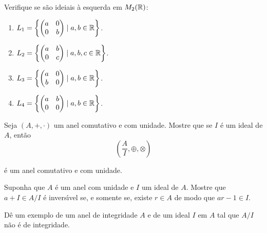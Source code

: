 \documentclass[12pt]{exam}
\begin{document}
    Verifique se s\~ao ideiais \`a esquerda em $M_2(\mathbb{R})$:
    \begin{enumerate}[label=({\alph*})]
        \item $L_1 = \left\{\begin{pmatrix}
            a & 0\\
            0 & b
        \end{pmatrix} \mid a, b \in \mathbb{R}\right\}$.

        \item $L_2 = \left\{\begin{pmatrix}
            a & b\\
            0 & c
        \end{pmatrix} \mid a, b, c \in \mathbb{R}\right\}$.

        \item $L_3 = \left\{\begin{pmatrix}
            a & 0\\
            b & 0
        \end{pmatrix} \mid a, b \in \mathbb{R}\right\}$.

        \item $L_4 = \left\{\begin{pmatrix}
            a & b\\
            0 & 0
        \end{pmatrix} \mid a, b \in \mathbb{R}\right\}$.
    \end{enumerate}

    \vspace{.3cm}

    \questao{} Seja $(A, +, \cdot)$ um anel comutativo e com unidade. Mostre que se $I$ {\'e} um ideal de $A$, ent\~ao
    \[
        \left(\dfrac{A}{I}, \oplus, \otimes\right)
    \]

    {\'e} um anel comutativo  e com unidade.

    \vspace{.3cm}

    \questao{} Suponha que $A$ {\'e} um anel com unidade e $I$ um ideal de $A$. Mostre que $a + I \in A/I$ {\'e} invers{\'\i}vel se, e somente se, existe $r \in A$ de modo que $ar - 1 \in I$.

    \vspace{.3cm}

    \questao{} D{\^e} um exemplo de um anel de integridade $A$ e de um ideal $I$ em $A$ tal que $A/I$ n{\~a}o {\'e} de integridade.
\end{document}
